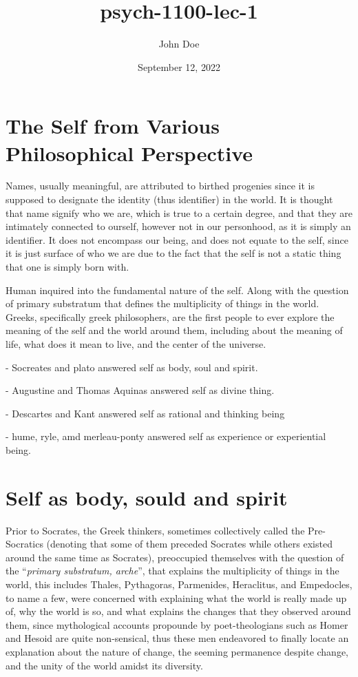 \documentclass[12pt, UTF8]{article}
\title{psych-1100-lec-1}
\author{John Doe}
\date{September 12, 2022}
\begin{document}
	\maketitle
	
	\section*{The Self from Various Philosophical Perspective}
	
	Names, usually meaningful, are attributed to birthed progenies since it is supposed to designate the identity (thus identifier) in the world. It is thought that name signify who we are, which is true to a certain degree, and that they are intimately connected to ourself, however not in our personhood, as it is simply an identifier. It does not encompass our being, and does not equate to the self, since it is just surface of who we are due to the fact that the self is not a static thing that one is simply born with.
	
	Human inquired into the fundamental nature of the self. Along with the question of primary substratum that defines the multiplicity of things in the world. Greeks, specifically greek philosophers, are the first people to ever explore the meaning of the self and the world around them, including about the meaning of life, what does it mean to live, and the center of the universe.
	
	- Socreates and plato answered self as body, soul and spirit.
	
	- Augustine and Thomas Aquinas answered self as divine thing.
	
	- Descartes and Kant answered self as rational and thinking being
	
	- hume, ryle, amd merleau-ponty answered self as experience or experiential being.
	
	\section{Self as body, sould and spirit}
	
	Prior to Socrates, the Greek thinkers, sometimes collectively called the Pre-Socratics (denoting that some of them preceded Socrates while others existed around the same time as Socrates), preoccupied themselves with the question of the ``\textit{primary substratum, arche}'', that explains the multiplicity of things in the world, this includes Thales, Pythagoras, Parmenides, Heraclitus, and Empedocles, to name a few, were concerned with explaining what the world is really made up of, why the world is so, and what explains the changes that they observed around them, since mythological accounts propounde by poet-theologians such as Homer and Hesoid are quite non-sensical, thus these men endeavored to finally locate an explanation about the nature of change, the seeming permanence despite change, and the unity of the world amidst its diversity.
	
\end{document}
